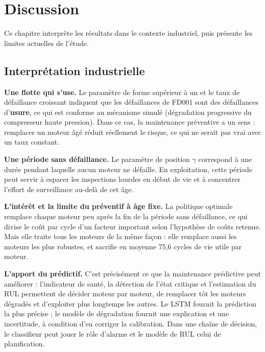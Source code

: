 \chapter{Discussion}\label{sec:discussion}

\chapintro

Ce chapitre interprète les résultats dans le contexte industriel, puis présente les limites actuelles de l'étude.

\section{Interprétation industrielle}\label{sec:interpretation}

\textbf{Une flotte qui s'use.} Le paramètre de forme supérieur à un et le taux de défaillance croissant indiquent que les défaillances de FD001 sont des défaillances d'\textbf{usure}, ce qui est conforme au mécanisme simulé (dégradation progressive du compresseur haute pression). Dans ce cas, la maintenance préventive a un sens : remplacer un moteur âgé réduit réellement le risque, ce qui ne serait pas vrai avec un taux constant.

\textbf{Une période sans défaillance.} Le paramètre de position $\gamma$ correspond à une durée pendant laquelle aucun moteur ne défaille. En exploitation, cette période peut servir à espacer les inspections lourdes en début de vie et à concentrer l'effort de surveillance au-delà de cet âge.

\textbf{L'intérêt et la limite du préventif à âge fixe.} La politique optimale remplace chaque moteur peu après la fin de la période sans défaillance, ce qui divise le coût par cycle d'un facteur important selon l'hypothèse de coûts retenue. Mais elle traite tous les moteurs de la même façon : elle remplace aussi les moteurs les plus robustes, et sacrifie en moyenne 75,6 cycles de vie utile par moteur.

\textbf{L'apport du prédictif.} C'est précisément ce que la maintenance prédictive peut améliorer : l'indicateur de santé, la détection de l'état critique et l'estimation du RUL permettent de décider moteur par moteur, de remplacer tôt les moteurs dégradés et d'exploiter plus longtemps les autres. Le LSTM fournit la prédiction la plus précise ; le modèle de dégradation fournit une explication et une incertitude, à condition d'en corriger la calibration. Dans une chaîne de décision, le classifieur peut jouer le rôle d'alarme et le modèle de RUL celui de planification.

